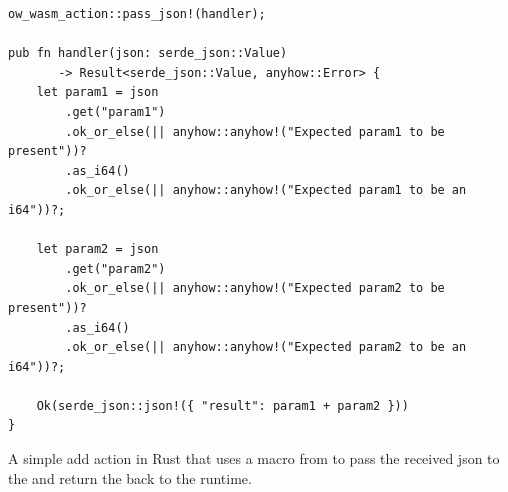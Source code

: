 \begin{listing}[ht]
\begin{verbatim}
ow_wasm_action::pass_json!(handler);

pub fn handler(json: serde_json::Value)
       -> Result<serde_json::Value, anyhow::Error> {
    let param1 = json
        .get("param1")
        .ok_or_else(|| anyhow::anyhow!("Expected param1 to be present"))?
        .as_i64()
        .ok_or_else(|| anyhow::anyhow!("Expected param1 to be an i64"))?;

    let param2 = json
        .get("param2")
        .ok_or_else(|| anyhow::anyhow!("Expected param2 to be present"))?
        .as_i64()
        .ok_or_else(|| anyhow::anyhow!("Expected param2 to be an i64"))?;

    Ok(serde_json::json!({ "result": param1 + param2 }))
}
\end{verbatim}
    \caption{A simple add action in Rust that uses a macro from  to pass the received json to the  and return the  back to the runtime.}
    \label{listing:add-action-example}
\end{listing}

